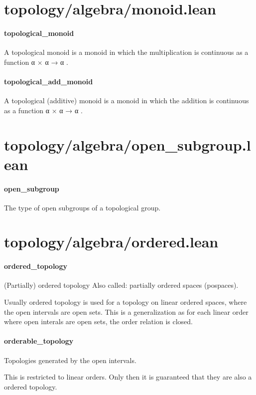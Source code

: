 \documentclass{article}
\begin{document}
\section{topology/algebra/monoid.lean}\paragraph{topological\_monoid}
\par
A topological monoid is a monoid in which the multiplication is continuous as a function
\colorbox[RGB]{253,246,227}{{{{\color[RGB]{101, 123, 131} α × α  }}}{{{\color[RGB]{133, 153, 0} → }}}{{{\color[RGB]{101, 123, 131}  α }}}}.
\paragraph{topological\_add\_monoid}
\par
A topological (additive) monoid is a monoid in which the addition is
continuous as a function 
\colorbox[RGB]{253,246,227}{{{{\color[RGB]{101, 123, 131} α × α  }}}{{{\color[RGB]{133, 153, 0} → }}}{{{\color[RGB]{101, 123, 131}  α }}}}.
\section{topology/algebra/open\_subgroup.lean}\paragraph{open\_subgroup}
\par
The type of open subgroups of a topological group.
\section{topology/algebra/ordered.lean}\paragraph{ordered\_topology}
\par
(Partially) ordered topology
Also called: partially ordered spaces (pospaces).
\par
Usually ordered topology is used for a topology on linear ordered spaces, where the open intervals
are open sets. This is a generalization as for each linear order where open interals are open sets,
the order relation is closed.
\paragraph{orderable\_topology}
\par
Topologies generated by the open intervals.
\par
This is restricted to linear orders. Only then it is guaranteed that they are also a ordered
topology.
\end{document}
